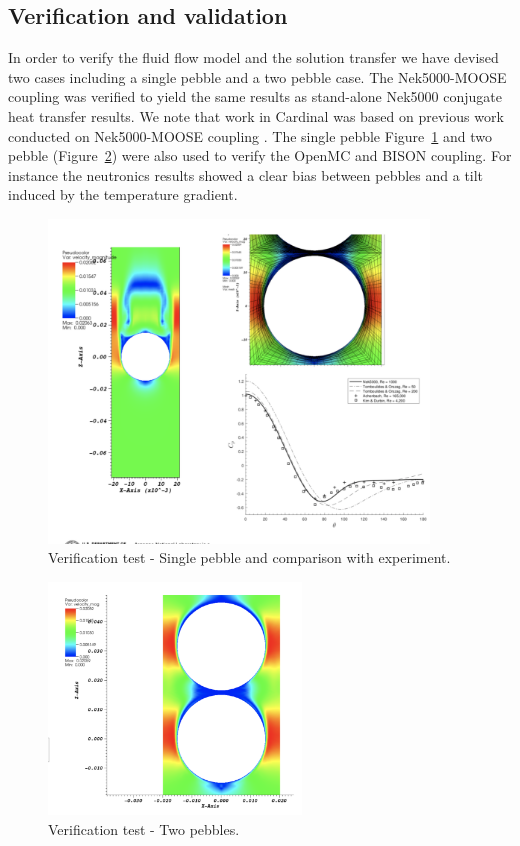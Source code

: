 \subsection{Verification and validation}
\label{ss:c3}

In order to verify the fluid flow model and the solution transfer we have devised two cases including a single pebble and a two pebble case. The Nek5000-MOOSE coupling was verified to yield the same results as stand-alone Nek5000 conjugate heat transfer results. We note that work in Cardinal was based on previous work conducted on Nek5000-MOOSE coupling \cite{novak2018preliminary}. The single pebble Figure~\ref{f:pb1} and two pebble (Figure~\ref{f:pb2}) were also used to verify the OpenMC and BISON coupling. For instance the neutronics results showed a clear bias between pebbles and a tilt induced by the temperature gradient.

\begin{figure}[!h]
\centering
\includegraphics[clip=true,width=0.9\textwidth]{Figures/pb_vv1}
\caption{Verification test - Single pebble and comparison with experiment.}
\label{f:pb1}
\end{figure}

\begin{figure}[!h]
\centering
\includegraphics[clip=true,width=0.6\textwidth]{Figures/pb_vv2}
\caption{Verification test - Two pebbles.}
\label{f:pb2}
\end{figure}


